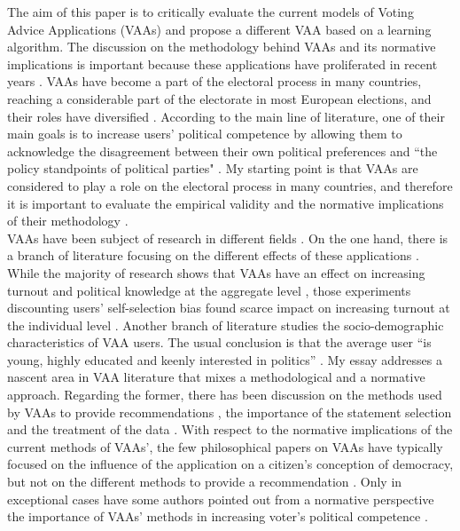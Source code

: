 \documentclass{scrartcl}
\begin{document}
The aim of this paper is to critically evaluate the current models of Voting Advice Applications (VAAs) and propose a different VAA based on a learning algorithm. The discussion on the methodology behind VAAs and its normative implications is important because these applications have proliferated in recent years \cite{marschall2014voting}. VAAs have become a part of the electoral process in many countries, reaching a considerable part of the electorate in most European  elections, and their roles have diversified \cite{alvarez2014party}. According to the main line of literature, one of their main goals is to increase users' political competence by allowing them to acknowledge the disagreement between their own political preferences and ``the policy standpoints of political parties" \cite[233]{Garzia2014}. My starting point is that VAAs are considered to play a role on the electoral process in many countries, and therefore it is important to evaluate the empirical validity and the normative implications of their methodology \cite{fossen2014s}.  
\\ 

VAAs have been subject of research in different fields \cite{alvarez2014party}. On the one hand, there is a branch of literature focusing on the different effects of these applications \cite{marschall2012voting}. While the majority of research shows that VAAs have an effect on increasing turnout and political knowledge at the aggregate level \cite{garzia2017voting}, those experiments discounting users' self-selection bias found scarce impact on increasing turnout at the individual level \cite{maheo2017information}. Another branch of literature studies the socio-demographic characteristics of VAA users. The usual conclusion is that the average user “is young, highly educated and keenly interested in politics” \cite[253]{cedroni2010voting}. My essay addresses a nascent area in VAA literature that mixes a methodological and a normative approach. Regarding the former, there has been discussion on the methods used by VAAs to provide recommendations \cite{Mendez2017}, the importance of the statement selection \cite{walgrave2009voting} and the treatment of the data \cite{Djouvas2016}. With respect to the normative implications of the current methods of VAAs', the few philosophical papers on VAAs have typically focused on the influence of the application on a citizen's conception of democracy, but not on the different methods to provide a recommendation   \cite{anderson2014matching}. Only in exceptional cases have some authors pointed out from a normative perspective the importance of VAAs' methods in increasing voter's political competence \cite{fossen2014s}. 
\\
\end{document}
